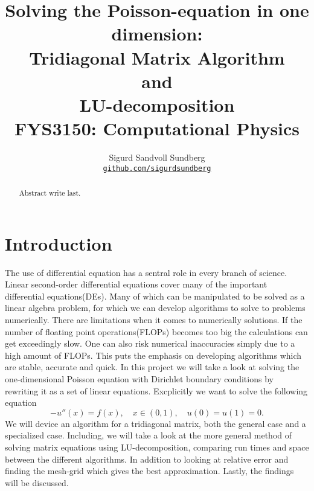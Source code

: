 \documentclass[10pt, a4paper]{amsart}
\title[Solving the Poisson-equation in one dimension]{Solving the Poisson-equation in one dimension: \\
\normalsize{Tridiagonal Matrix Algorithm\\
 and \\
 LU-decomposition} \\
  \hrulefill\small{ FYS3150: Computational Physics }\hrulefill}
\author[Sundberg]{Sigurd Sandvoll Sundberg \\
  \href{https://https://github.com/SigurdSundberg/FYS3150/}{\texttt{github.com/sigurdsundberg}}}
\begin{document}
\begin{titlepage}
\begin{abstract}
Abstract write last.
\end{abstract}
\maketitle
\tableofcontents
\end{titlepage}

\section{Introduction}
The use of differential equation has a sentral role in every branch of science. Linear second-order differential equations cover many of the important differential equations(DEs). Many of which can be manipulated to be solved as a linear algebra problem, for which we can develop algorithms to solve to problems numerically. There are limitations when it comes to numerically solutions. If the number of floating point operations(FLOPs) becomes too big the calculations can get exceedingly slow. One can also risk numerical inaccuracies simply due to a high amount of FLOPs. This puts the emphasis on developing algorithms which are stable, accurate and quick. 
In this project we will take a look at solving the one-dimensional Poisson equation with Dirichlet boundary conditions by rewriting it as a set of linear equations. Excplicitly we want to solve the following equation
\begin{equation}
-u''(x) = f(x), \quad x\in(0,1), \quad u(0)=u(1)=0.\label{eq:base}
\end{equation}
We will device an algorithm for a tridiagonal matrix, both the general case and a specialized case. Including, we will take a look at the more general method of solving matrix equations using LU-decomposition, comparing run times and space between the different algorithms. In addition to looking at relative error and finding the mesh-grid which gives the best approximation. Lastly, the findings will be discussed. 
\end{document}
